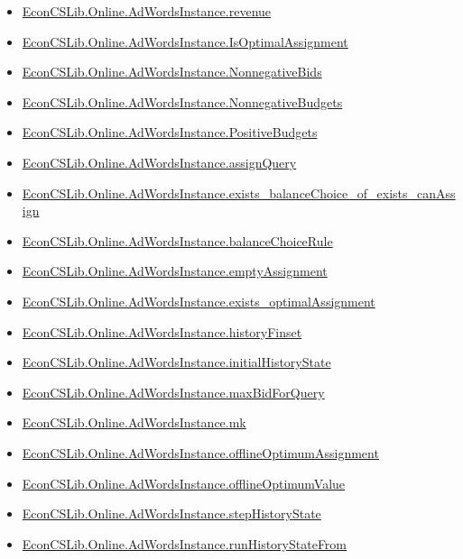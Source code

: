 \documentclass[10pt]{article}
\begin{document}
\begin{itemize}[leftmargin=1.2em]
\begin{itemize}[leftmargin=1.2em]
\item \hyperlink{library-prerequisite-b1be2d316b36465d}{EconCSLib.Online.AdWordsInstance.revenue}
\item \hyperlink{library-prerequisite-040ea8c298a564be}{EconCSLib.Online.AdWordsInstance.IsOptimalAssignment}
\item \hyperlink{library-prerequisite-eda066d0c51567e4}{EconCSLib.Online.AdWordsInstance.NonnegativeBids}
\item \hyperlink{library-prerequisite-d2f4f29b8fea9bd7}{EconCSLib.Online.AdWordsInstance.NonnegativeBudgets}
\item \hyperlink{library-prerequisite-f75131676b602af5}{EconCSLib.Online.AdWordsInstance.PositiveBudgets}
\item \hyperlink{library-prerequisite-758b3b25c1f85843}{EconCSLib.Online.AdWordsInstance.assignQuery}
\item \hyperlink{library-prerequisite-12cda3caab127184}{EconCSLib.Online.AdWordsInstance.exists\_balanceChoice\_of\_exists\_canAssign}
\item \hyperlink{library-prerequisite-b2df90f580b6a372}{EconCSLib.Online.AdWordsInstance.balanceChoiceRule}
\item \hyperlink{library-prerequisite-b9d976ea227d71db}{EconCSLib.Online.AdWordsInstance.emptyAssignment}
\item \hyperlink{library-prerequisite-9c67d3eca0abf3f6}{EconCSLib.Online.AdWordsInstance.exists\_optimalAssignment}
\item \hyperlink{library-prerequisite-0deaac5f6c85402d}{EconCSLib.Online.AdWordsInstance.historyFinset}
\item \hyperlink{library-prerequisite-98f29ee41cf87a87}{EconCSLib.Online.AdWordsInstance.initialHistoryState}
\item \hyperlink{library-prerequisite-3a2eddbb62df2445}{EconCSLib.Online.AdWordsInstance.maxBidForQuery}
\item \hyperlink{library-prerequisite-1868ba9e77e66d41}{EconCSLib.Online.AdWordsInstance.mk}
\item \hyperlink{library-prerequisite-6d1bddd5197a6848}{EconCSLib.Online.AdWordsInstance.offlineOptimumAssignment}
\item \hyperlink{library-prerequisite-f9fde789b723ccac}{EconCSLib.Online.AdWordsInstance.offlineOptimumValue}
\item \hyperlink{library-prerequisite-f323fde6075b177d}{EconCSLib.Online.AdWordsInstance.stepHistoryState}
\item \hyperlink{library-prerequisite-7c1cb1ce0191e508}{EconCSLib.Online.AdWordsInstance.runHistoryStateFrom}

\end{itemize}
\end{itemize}
\end{document}
